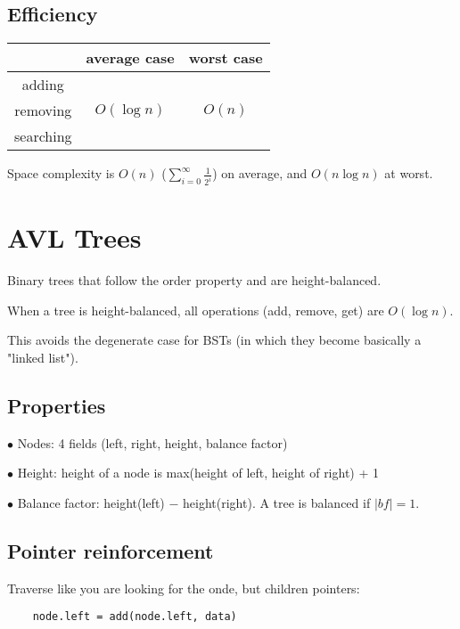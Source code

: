 \documentclass[english,openany]{book}
\begin{document}
    \section{Efficiency}

    \begin{tabular}{c|c|c}
        &average case&worst case\\
        \hline
        adding&&\\
        removing&$O(\log n)$&$O(n)$\\
        searching&&\\
    \end{tabular}

    Space complexity is $O(n)$ ($\sum_{i=0}^{\infty} \frac{1}{2^i}$) on average, and $O(n \log n)$ at worst.


    \chapter{AVL Trees}

    Binary trees that follow the order property and are height-balanced.

    When a tree is height-balanced, all operations (add, remove, get) are $O(\log n)$.

    This avoids the degenerate case for BSTs (in which they become basically a "linked list").\\

    \section{Properties}

    $\bullet$ Nodes: 4 fields (left, right, height, balance factor)

    $\bullet$ Height: height of a node is  max(height of left, height of right) + 1

    $\bullet$ Balance factor: height(left) $-$ height(right). A tree is balanced if $|bf| = 1$.\\

    \newpage
    \section{Pointer reinforcement}

    Traverse like you are looking for the onde, but children pointers:
    \begin{lstlisting}
    node.left = add(node.left, data)
    \end{lstlisting}
\end{document}
